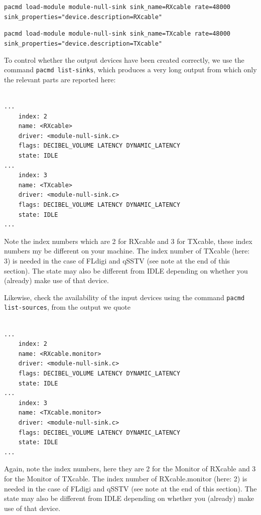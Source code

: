 \documentclass[12pt]{book}
\begin{document}
\texttt{pacmd load-module module-null-sink sink\_name=RXcable rate=48000 \\
sink\_properties="device.description=RXcable"
}

\texttt{pacmd load-module module-null-sink sink\_name=TXcable rate=48000 \\
sink\_properties="device.description=TXcable"
}

To control whether the output devices have been created correctly, we use the command
\texttt{pacmd list-sinks}, which produces
a very long output from which only the relevant parts are reported here:

\begin{small}
\begin{verbatim}

...
    index: 2
	name: <RXcable>
	driver: <module-null-sink.c>
	flags: DECIBEL_VOLUME LATENCY DYNAMIC_LATENCY
	state: IDLE
...
    index: 3
	name: <TXcable>
	driver: <module-null-sink.c>
	flags: DECIBEL_VOLUME LATENCY DYNAMIC_LATENCY
	state: IDLE
...
\end{verbatim}
\end{small}

Note the index numbers which are 2 for RXcable and 3 for TXcable, these index numbers my
be different on your machine. The index number of TXcable (here: 3) is needed in the
case of FLdigi and qSSTV (see note at the end of this section).
The state may also be different from IDLE depending on whether
you (already) make use of that device.

Likewise, check the availability of the input devices using
the command \texttt{pacmd list-sources}, from the output we quote

\begin{small}
\begin{verbatim}

...
    index: 2
	name: <RXcable.monitor>
	driver: <module-null-sink.c>
	flags: DECIBEL_VOLUME LATENCY DYNAMIC_LATENCY
	state: IDLE
...
    index: 3
	name: <TXcable.monitor>
	driver: <module-null-sink.c>
	flags: DECIBEL_VOLUME LATENCY DYNAMIC_LATENCY
	state: IDLE
...
\end{verbatim}
\end{small}

Again, note the index numbers, here they are 2 for the Monitor of RXcable and 3 for the Monitor
of TXcable. The index number of RXcable.monitor (here: 2) is needed in the
case of FLdigi and qSSTV (see note at the end of this section).
The state may also be different from IDLE depending on whether
you (already) make use of that device.
\end{document}
